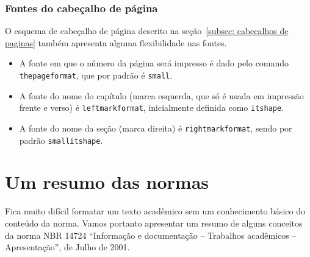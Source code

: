 \documentclass[espaco=simples,appendix=Name]{abnt}
\newcommand{\ac}{\symbol{123}}  %
\newcommand{\fc}{\symbol{125}}  %
\newcommand{\bs}{\symbol{92}}   %
\begin{document}


\subsection{Fontes do cabeçalho de página}

O esquema de cabeçalho de página descrito na 
seção~\ref{subsec: cabecalhos de paginas} também apresenta alguma
flexibilidade nas fontes. 

\begin{itemize}

\item A fonte em que o número da página será impresso é dado pelo comando
  \texttt{\bs thepageformat}, que por padrão é \texttt{\bs small}.
\item A fonte do nome do capítulo (marca esquerda, que só é usada em
  impressão frente e verso) é
  \texttt{\bs leftmarkformat}, inicialmente definida como
  \texttt{\bs itshape}. 
\item A fonte do nome da seção (marca direita) é 
  \texttt{\bs rightmarkformat}, sendo por padrão
  \texttt{\bs small\bs itshape}.

\end{itemize}



\apendice

\chapter{Um resumo das normas}\label{sec: um resumo das normas}

Fica muito difícil formatar um texto acadêmico
sem um conhecimento básico do conteúdo da norma. Vamos portanto apresentar
um resumo de alguns conceitos da norma NBR 14724 ``Informação e
documentação -- Trabalhos acadêmicos -- Apresentação'', de Julho de 2001. 
\end{document}
